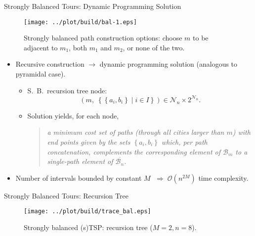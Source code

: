 \documentclass[
  size=8pt,
  style=klope,
  paper=screen,
  mode=present,
  nohandoutpagebreaks,
  pauseslide,
  hlsections,
  fleqn,
]{powerdot}
\def\eqitspace{\vspace{-5mm}}
\begin{document}
\begin{slide}[toc=]{Strongly Balanced Tours: Dynamic Programming Solution}
    \begin{figure}[H]
      \centering
      \texttt{[image: ../plot/build/bal-1.eps]}
      \caption{
        Strongly balanced path construction options: choose $m$ to be adjacent to $m_1$, both $m_1$ and $m_2$, or none of the two.
     }
    \end{figure}
  \begin{itemize}
  \item
    Recursive construction $\rightarrow$ dynamic programming solution (analogous to pyramidal case).
    \begin{itemize}
    \item
      S.\ B.\ recursion tree node:
      \begin{equation}
      \left(m, \;
      \left\{\left\{a_i,b_i\right\} \mid i \in I\right\}\right)
       \in \mathcal{N}_n \times 2^{\mathcal{N}_n}.
      \end{equation}
      \eqitspace%
    \item
      Solution yields, for each node,
      \vspace{2mm}
      \begin{quote}
      {\itshape
        a minimum cost set of paths
        (through all cities larger than $m$)
        with end points given by the sets $\left\{a_i,b_i\right\}$
        which, per path concatenation,
        complements the corresponding element of $\mathcal{B}_m$ to a
        single-path element of $\overline{\mathcal{B}_n}$.
      }
      \end{quote}
      \vspace{2mm}
    \end{itemize}
    \eqitspace%
  \item
    Number of intervals bounded by constant $M$ $\;\Rightarrow\; \mathcal{O}\left(n^{2M}\right)$ time complexity.
  \end{itemize}
\end{slide}

\begin{slide}[toc=]{Strongly Balanced Tours: Recursion Tree}
  \begin{figure}[H]
    \centering
    \texttt{[image: ../plot/build/trace\_bal.eps]}
    \caption{Strongly balanced (s)TSP: recursion tree ($M=2,n=8$).}
  \end{figure}
\end{slide}
\end{document}
